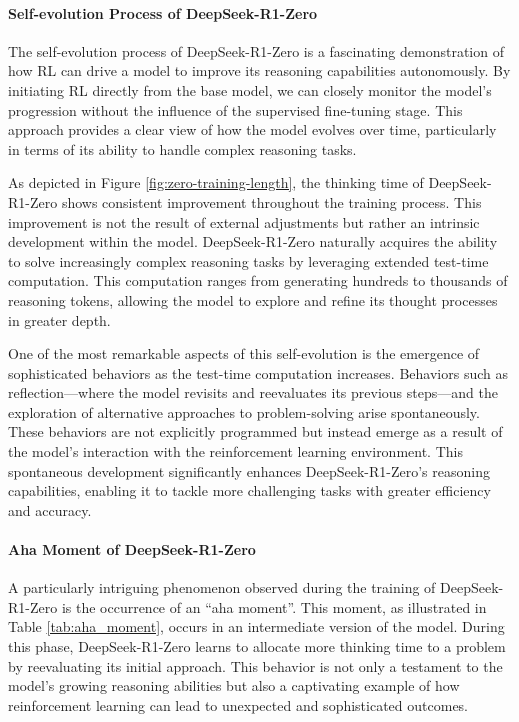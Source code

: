 \documentclass[11pt, a4paper, logo, copyright, nonumbering]{deepseek}
\newcommand{\dsro}{DeepSeek-R1-Zero}
\begin{document}
\paragraph{Self-evolution Process of \dsro{}}
The self-evolution process of \dsro{} is a fascinating demonstration of how RL can drive a model to improve its reasoning capabilities autonomously. By initiating RL directly from the base model, we can closely monitor the model's progression without the influence of the supervised fine-tuning stage. This approach provides a clear view of how the model evolves over time, particularly in terms of its ability to handle complex reasoning tasks.

As depicted in Figure \ref{fig:zero-training-length}, the thinking time of \dsro{} shows consistent improvement throughout the training process. This improvement is not the result of external adjustments but rather an intrinsic development within the model. \dsro{} naturally acquires the ability to solve increasingly complex reasoning tasks by leveraging extended test-time computation. This computation ranges from generating hundreds to thousands of reasoning tokens, allowing the model to explore and refine its thought processes in greater depth.

One of the most remarkable aspects of this self-evolution is the emergence of sophisticated behaviors as the test-time computation increases. Behaviors such as reflection—where the model revisits and reevaluates its previous steps—and the exploration of alternative approaches to problem-solving arise spontaneously. These behaviors are not explicitly programmed but instead emerge as a result of the model's interaction with the reinforcement learning environment. This spontaneous development significantly enhances \dsro{}'s reasoning capabilities, enabling it to tackle more challenging tasks with greater efficiency and accuracy.

\paragraph{Aha Moment of \dsro{}}
A particularly intriguing phenomenon observed during the training of \dsro{} is the occurrence of an ``aha moment''. This moment, as illustrated in Table \ref{tab:aha_moment}, occurs in an intermediate version of the model. During this phase, \dsro{} learns to allocate more thinking time to a problem by reevaluating its initial approach. This behavior is not only a testament to the model's growing reasoning abilities but also a captivating example of how reinforcement learning can lead to unexpected and sophisticated outcomes.
\end{document}
